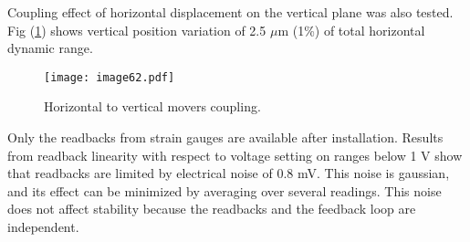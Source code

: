 Coupling effect of horizontal displacement on the vertical plane was also tested. Fig (\ref{f:Cedratcoupling}) shows vertical position variation of 2.5 $\mu$m (1\%) of total horizontal dynamic range.\par
\begin{figure}[!htb]
\centering
\texttt{[image: image62.pdf]}\caption{Horizontal to vertical movers coupling.}\label{f:Cedratcoupling}
\end{figure}
Only the readbacks from strain gauges are available after installation. Results from readback linearity with respect to voltage setting on ranges below 1 V show that readbacks are limited by electrical noise of $0.8$ mV. This noise is gaussian, and its effect can be minimized by averaging over several readings. This noise does not affect stability because the readbacks and the feedback loop are independent.

